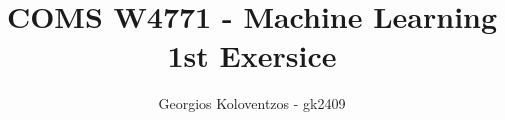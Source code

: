 \documentclass[letterpaper,single,9pt]{article}
\begin{document}
\title{COMS W4771 - Machine Learning 1st Exersice}

  \author{ {\rm Georgios Koloventzos - gk2409} \\ }

\maketitle





\end{document}
